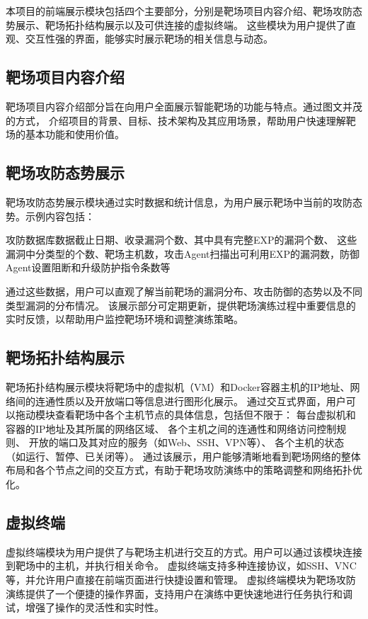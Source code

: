 \documentclass[lang=cn,10pt]{elegantbook}
\begin{document}
本项目的前端展示模块包括四个主要部分，分别是靶场项目内容介绍、靶场攻防态势展示、靶场拓扑结构展示以及可供连接的虚拟终端。
这些模块为用户提供了直观、交互性强的界面，能够实时展示靶场的相关信息与动态。

\subsection{靶场项目内容介绍}

靶场项目内容介绍部分旨在向用户全面展示智能靶场的功能与特点。通过图文并茂的方式，
介绍项目的背景、目标、技术架构及其应用场景，帮助用户快速理解靶场的基本功能和使用价值。

\subsection{靶场攻防态势展示}

靶场攻防态势展示模块通过实时数据和统计信息，为用户展示靶场中当前的攻防态势。示例内容包括：  

攻防数据库数据截止日期、收录漏洞个数、其中具有完整EXP的漏洞个数、  
这些漏洞中分类型的个数、靶场主机数，攻击Agent扫描出可利用EXP的漏洞数，防御Agent设置阻断和升级防护指令条数等

通过这些数据，用户可以直观了解当前靶场的漏洞分布、攻击防御的态势以及不同类型漏洞的分布情况。
该展示部分可定期更新，提供靶场演练过程中重要信息的实时反馈，以帮助用户监控靶场环境和调整演练策略。

\subsection{靶场拓扑结构展示}

靶场拓扑结构展示模块将靶场中的虚拟机（VM）和Docker容器主机的IP地址、网络间的连通性质以及开放端口等信息进行图形化展示。
通过交互式界面，用户可以拖动模块查看靶场中各个主机节点的具体信息，包括但不限于：
每台虚拟机和容器的IP地址及其所属的网络区域、  
各个主机之间的连通性和网络访问控制规则、  
开放的端口及其对应的服务（如Web、SSH、VPN等）、  
各个主机的状态（如运行、暂停、已关闭等）。
通过该展示，用户能够清晰地看到靶场网络的整体布局和各个节点之间的交互方式，有助于靶场攻防演练中的策略调整和网络拓扑优化。

\subsection{虚拟终端}

虚拟终端模块为用户提供了与靶场主机进行交互的方式。用户可以通过该模块连接到靶场中的主机，并执行相关命令。
虚拟终端支持多种连接协议，如SSH、VNC等，并允许用户直接在前端页面进行快捷设置和管理。
虚拟终端模块为靶场攻防演练提供了一个便捷的操作界面，支持用户在演练中更快速地进行任务执行和调试，增强了操作的灵活性和实时性。
\end{document}
